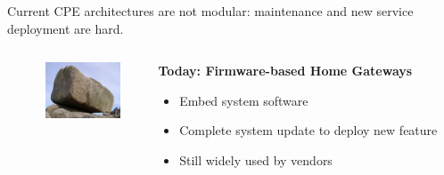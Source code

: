 \documentclass[a4paper]{beamer}
\begin{document}
\begin{frame}{Current CPE architectures are not modular: maintenance and new service deployment are hard.}
										
	\begin{columns}[T]
		\begin{column}{.01\textwidth} %
		\end{column}
		\begin{column}[T]{0.15 \textwidth} 
			\vspace{1em}
			\includegraphics[width=6em]{monolith.jpg}
		\end{column}
																						
																										
		\begin{column}[T]{0.70 \textwidth} 
																																							
																																								   
			\textbf{Today: Firmware-based Home Gateways}
			\begin{itemize}
				\item Embed system software
				\item Complete system update to deploy new feature
				\item Still widely used by vendors
			\end{itemize}
			\vspace{5mm}
																																								     
																																							
		\end{column}
																										
	\end{columns}
										
									
											
\end{frame}
\end{document}
